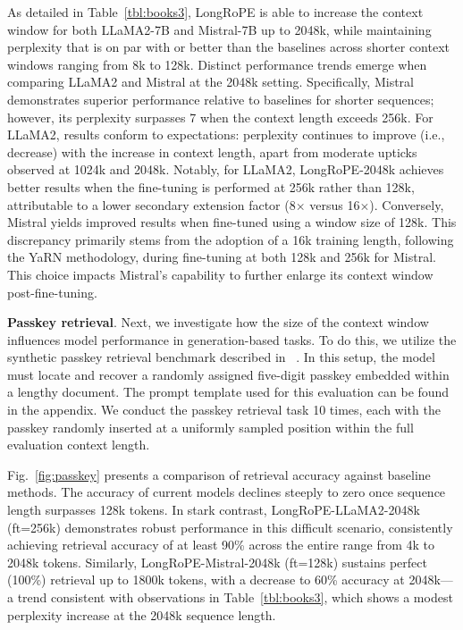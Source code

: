 As detailed in Table~\ref{tbl:books3}, LongRoPE is able to increase the context window for both LLaMA2-7B and Mistral-7B up to 2048k, while maintaining perplexity that is on par with or better than the baselines across shorter context windows ranging from 8k to 128k. Distinct performance trends emerge when comparing LLaMA2 and Mistral at the 2048k setting. Specifically, Mistral demonstrates superior performance relative to baselines for shorter sequences; however, its perplexity surpasses 7 when the context length exceeds 256k. For LLaMA2, results conform to expectations: perplexity continues to improve (i.e., decrease) with the increase in context length, apart from moderate upticks observed at 1024k and 2048k. Notably, for LLaMA2, LongRoPE-2048k achieves better results when the fine-tuning is performed at 256k rather than 128k, attributable to a lower secondary extension factor (8$\times$ versus 16$\times$). Conversely, Mistral yields improved results when fine-tuned using a window size of 128k. This discrepancy primarily stems from the adoption of a 16k training length, following the YaRN methodology, during fine-tuning at both 128k and 256k for Mistral. This choice impacts Mistral’s capability to further enlarge its context window post-fine-tuning.

\textbf{Passkey retrieval}. Next, we investigate how the size of the context window influences model performance in generation-based tasks. To do this, we utilize the synthetic passkey retrieval benchmark described in ~\cite{passkey}. In this setup, the model must locate and recover a randomly assigned five-digit passkey embedded within a lengthy document. The prompt template used for this evaluation can be found in the appendix. We conduct the passkey retrieval task 10 times, each with the passkey randomly inserted at a uniformly sampled position within the full evaluation context length.

Fig.~\ref{fig:passkey} presents a comparison of retrieval accuracy against baseline methods. The accuracy of current models declines steeply to zero once sequence length surpasses 128k tokens. In stark contrast, LongRoPE-LLaMA2-2048k (ft=256k) demonstrates robust performance in this difficult scenario, consistently achieving retrieval accuracy of at least 90\% across the entire range from 4k to 2048k tokens. Similarly, LongRoPE-Mistral-2048k (ft=128k) sustains perfect (100\%) retrieval up to 1800k tokens, with a decrease to 60\% accuracy at 2048k—a trend consistent with observations in Table~\ref{tbl:books3}, which shows a modest perplexity increase at the 2048k sequence length.

